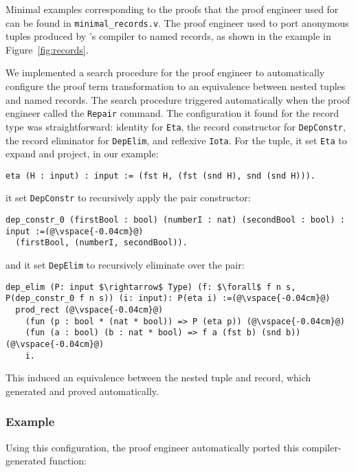 Minimal examples corresponding to the proofs that the proof engineer used \toolname for
can be found in \lstinline{minimal_records.v}.
The proof engineer used \toolname to port anonymous tuples produced by \company's compiler
to named records, as shown in the example in Figure~\ref{fig:records}.

We implemented a search procedure for the proof engineer to automatically configure the proof term transformation to an equivalence
between nested tuples and named records.
The search procedure triggered automatically when the proof engineer called the \lstinline{Repair} command.
The configuration it found for the record type was straightforward: identity for \lstinline{Eta},
the record constructor for \lstinline{DepConstr}, the record eliminator for \lstinline{DepElim}, and reflexive \lstinline{Iota}.
For the tuple, it set \lstinline{Eta} to expand and project, in our example:
\begin{lstlisting}[backgroundcolor=\color{cyan!30}]
eta (H : input) : input := (fst H, (fst (snd H), snd (snd H))).
\end{lstlisting}
it set \lstinline{DepConstr} to recursively apply the pair constructor:

\begin{lstlisting}[backgroundcolor=\color{cyan!30}]
dep_constr_0 (firstBool : bool) (numberI : nat) (secondBool : bool) : input :=(@\vspace{-0.04cm}@)
  (firstBool, (numberI, secondBool)).
\end{lstlisting}
and it set \lstinline{DepElim} to recursively eliminate over the pair:

\begin{lstlisting}[backgroundcolor=\color{cyan!30}]
dep_elim (P: input $\rightarrow$ Type) (f: $\forall$ f n s, P(dep_constr_0 f n s)) (i: input): P(eta i) :=(@\vspace{-0.04cm}@)
  prod_rect (@\vspace{-0.04cm}@)
    (fun (p : bool * (nat * bool)) => P (eta p)) (@\vspace{-0.04cm}@)
    (fun (a : bool) (b : nat * bool) => f a (fst b) (snd b)) (@\vspace{-0.04cm}@)
    i.
\end{lstlisting}
This induced an equivalence between the nested tuple and record,
which \toolname generated and proved automatically.

\subsubsection{Example}
Using this configuration, the proof engineer automatically ported this compiler-generated function:

